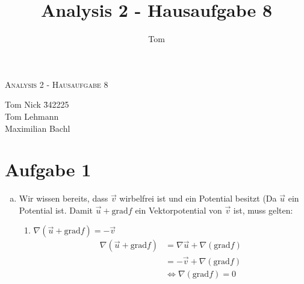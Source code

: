 \documentclass[10pt,a4paper,parskip=half]{scrartcl}
\author{Tom}
\title{Analysis 2 - Hausaufgabe 8}
\begin{document}
\begin{center}
\textsc{\Large{Analysis 2 - Hausaufgabe 8}} \\
\end{center}
\begin{tabbing}
Tom Nick \hspace{1.4cm}\= 342225\\
Tom Lehmann\\
Maximilian Bachl
\end{tabbing}
\section*{Aufgabe 1}
	\begin{enumerate}[(a)]
\item Wir wissen bereits, dass $\vec{v}$ wirbelfrei ist und ein Potential besitzt (Da $\vec{u}$ ein Potential ist. Damit $\vec{u} + \text{grad} f$ ein Vektorpotential von $\vec{v}$ ist, muss gelten:
\begin{enumerate}[1.]
\item $\nabla (\vec{u} + \text{grad} f) = -\vec{v} $ \\
\begin{align*}
\nabla (\vec{u} + \text{grad} f) &= \nabla \vec{u} + \nabla (\text{grad} f) \\
&= -\vec{v} + \nabla(\text{grad} f) \\
&\Leftrightarrow \nabla(\text{grad} f) = 0 \\
\end{align*}


\end{enumerate}
\end{enumerate}
\end{document}
